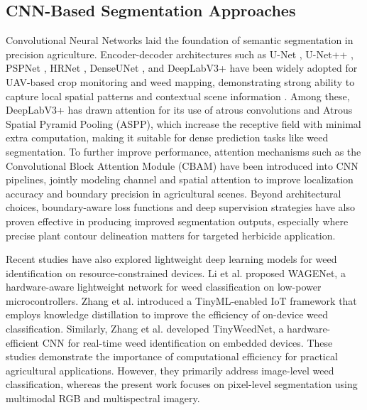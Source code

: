 \documentclass[pdflatex,sn-mathphys-num]{sn-jnl}
\begin{document}
\subsection{CNN-Based Segmentation Approaches}
Convolutional Neural Networks laid the foundation of semantic segmentation in precision agriculture. Encoder-decoder architectures such as U-Net \cite{ronneberger2015unet}, U-Net++ \cite{zhou2018unet++}, PSPNet \cite{zhao2017pyramid}, HRNet \cite{sun2019high}, DenseUNet \cite{safarov2021denseunet}, and DeepLabV3+ \cite{chen2018Deeplabv3plus} have been widely adopted for UAV-based crop monitoring and weed mapping, demonstrating strong ability to capture local spatial patterns and contextual scene information \cite{silva2024deep}. Among these, DeepLabV3+ has drawn attention for its use of atrous convolutions and Atrous Spatial Pyramid Pooling (ASPP), which increase the receptive field with minimal extra computation, making it suitable for dense prediction tasks like weed segmentation\cite{chen2018Deeplabv3plus}. To further improve performance, attention mechanisms such as the Convolutional Block Attention Module (CBAM)\cite{woo2018cbam} have been introduced into CNN pipelines, jointly modeling channel and spatial attention to improve localization accuracy and boundary precision in agricultural scenes\cite{li2022attention_agriculture}. Beyond architectural choices, boundary-aware loss functions and deep supervision strategies have also proven effective in producing improved segmentation outputs, especially where precise plant contour delineation matters for targeted herbicide application. 


Recent studies have also explored lightweight deep learning
models for weed identification on resource-constrained
devices. Li et al. \cite{li2026wagenet} proposed WAGENet,
a hardware-aware lightweight network for weed
classification on low-power microcontrollers.
Zhang et al. \cite{zhang2026tinymlkd} introduced a
TinyML-enabled IoT framework that employs knowledge
distillation to improve the efficiency of on-device
weed classification. Similarly, Zhang et al.
\cite{zhang2026tinyweednet} developed TinyWeedNet,
a hardware-efficient CNN for real-time weed
identification on embedded devices. These studies
demonstrate the importance of computational efficiency
for practical agricultural applications. However,
they primarily address image-level weed classification,
whereas the present work focuses on pixel-level
segmentation using multimodal RGB and multispectral
imagery.
\end{document}
